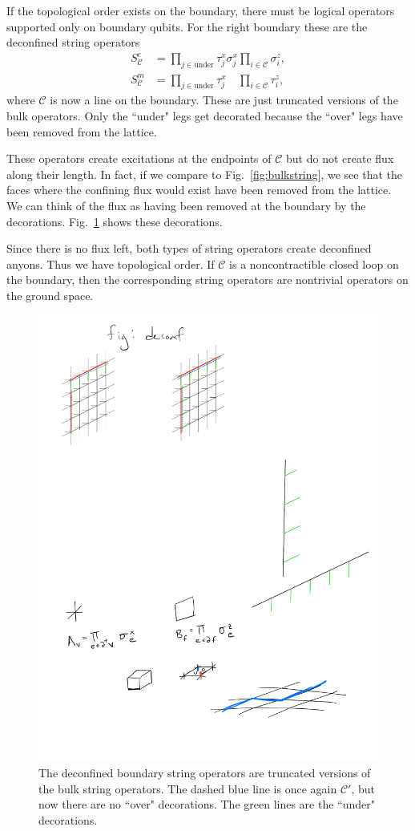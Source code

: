 \documentclass[twocolumn, longbibliography]{revtex4-2}
\newcommand{\C}{\mathcal{C}}
\begin{document}
If the topological order exists on the boundary, there must be logical operators supported only on boundary qubits. For the right boundary these are the deconfined string operators
\begin{align}
S^e_\C &= \prod_{j\in \text{under}}\tau_j^x \sigma_j^x \prod_{i\in\mathcal{C}} \sigma_i^z,\\
S^m_\C &= \prod_{j\in \text{under}}\tau_j^x\phantom{ \sigma_j^x} \prod_{i\in\mathcal{C}} \tau_i^z,
\end{align}
where $\mathcal{C}$ is now a line on the boundary. These are just truncated versions of the bulk operators. Only the ``under" legs get decorated because the ``over" legs have been removed from the lattice.

These operators create excitations at the endpoints of $\C$ but do not create flux along their length.  In fact, if we compare to Fig.~\ref{fig:bulkstring}, we see that the faces where the confining flux would exist have been removed from the lattice.
We can think of the flux as having been removed at the boundary by the decorations.  Fig.~\ref{fig:deconf} shows these decorations. 

Since there is no flux left, both types of string operators create deconfined anyons. Thus we have topological order.
If $\C$ is a noncontractible closed loop on the boundary, then the corresponding string operators are nontrivial operators on the ground space.

\begin{figure}
\centering
\includegraphics[width=.5\linewidth]{deconf}
\caption{The deconfined boundary string operators are truncated versions of the bulk string operators. The dashed blue line is once again $\C'$, but now there are no ``over" decorations. The green lines are the ``under" decorations.}
\label{fig:deconf}
\end{figure}
\end{document}
